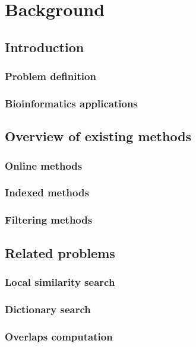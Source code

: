 \chapter{Background}
\section{Introduction}
\subsection{Problem definition}
\subsection{Bioinformatics applications}
\section{Overview of existing methods}
\subsection{Online methods}
\subsection{Indexed methods}
\subsection{Filtering methods}
\section{Related problems}
\subsection{Local similarity search}
\subsection{Dictionary search}
\subsection{Overlaps computation}
